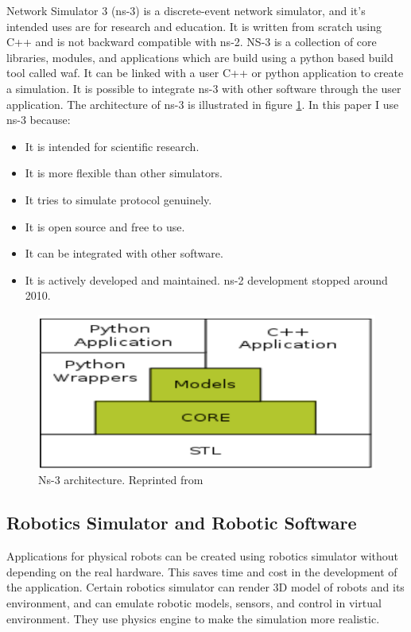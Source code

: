 Network Simulator 3 (ns-3) is a discrete-event network simulator, and it's intended uses are for research and education. It is written from scratch using C++ and is not backward compatible with ns-2. NS-3 is a collection of core libraries, modules, and applications which are build using a python based build tool called waf. It can be linked with a user C++ or python application to create a simulation. It is possible to integrate ns-3 with other software through the user application. The architecture of ns-3 is illustrated in figure \ref{fig:ns3-architecture}. In this paper I use ns-3 because:
\begin{itemize}
	\item It is intended for scientific research.
	\item It is more flexible than other simulators.
	\item It tries to simulate protocol genuinely.
	\item It is open source and free to use.
	\item It can be integrated with other software.
	\item It is actively developed and maintained. ns-2 development stopped around 2010.
\end{itemize}

\begin{figure}
	\centering
	\includegraphics[width=5in]{figures/literature/ns3-architecture}
	\caption[Ns-3 architecture]{\small 
		Ns-3 architecture. Reprinted from  }
	\label{fig:ns3-architecture}
\end{figure}

\subsection{Robotics Simulator and Robotic Software}

Applications for physical robots can be created using robotics simulator without depending on the real hardware. This saves time and cost in the development of the application. Certain robotics simulator can render 3D model of robots and its environment, and can emulate robotic models, sensors, and control in virtual environment. They use physics engine to make the simulation more realistic.

